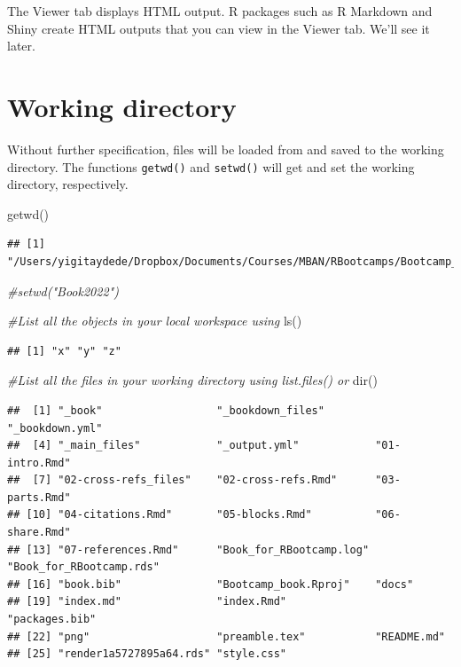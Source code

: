 \documentclass[
]{book}
\newenvironment{Shaded}{\begin{snugshade}}{\end{snugshade}}
\newcommand{\CommentTok}[1]{\textcolor[rgb]{0.56,0.35,0.01}{\textit{#1}}}
\newcommand{\FunctionTok}[1]{\textcolor[rgb]{0.00,0.00,0.00}{#1}}
\newcommand{\NormalTok}[1]{#1}
\theoremstyle{definition}
\theoremstyle{definition}
\theoremstyle{definition}
\theoremstyle{definition}
\theoremstyle{remark}
\begin{document}
The Viewer tab displays HTML output. R packages such as R Markdown and Shiny create HTML outputs that you can view in the Viewer tab. We'll see it later.

\hypertarget{working-directory}{%
\section{Working directory}\label{working-directory}}

Without further specification, files will be loaded from and saved to the working directory. The functions \texttt{getwd()} and \texttt{setwd()} will get and set the working directory, respectively.

\begin{Shaded}
\begin{Highlighting}[]
\FunctionTok{getwd}\NormalTok{()}
\end{Highlighting}
\end{Shaded}

\begin{verbatim}
## [1] "/Users/yigitaydede/Dropbox/Documents/Courses/MBAN/RBootcamps/Bootcamp_book"
\end{verbatim}

\begin{Shaded}
\begin{Highlighting}[]
\CommentTok{\#setwd("Book2022")}

\CommentTok{\#List all the objects in your local workspace using}
\FunctionTok{ls}\NormalTok{()}
\end{Highlighting}
\end{Shaded}

\begin{verbatim}
## [1] "x" "y" "z"
\end{verbatim}

\begin{Shaded}
\begin{Highlighting}[]
\CommentTok{\#List all the files in your working directory using list.files() or }
\FunctionTok{dir}\NormalTok{()}
\end{Highlighting}
\end{Shaded}

\begin{verbatim}
##  [1] "_book"                  "_bookdown_files"        "_bookdown.yml"         
##  [4] "_main_files"            "_output.yml"            "01-intro.Rmd"          
##  [7] "02-cross-refs_files"    "02-cross-refs.Rmd"      "03-parts.Rmd"          
## [10] "04-citations.Rmd"       "05-blocks.Rmd"          "06-share.Rmd"          
## [13] "07-references.Rmd"      "Book_for_RBootcamp.log" "Book_for_RBootcamp.rds"
## [16] "book.bib"               "Bootcamp_book.Rproj"    "docs"                  
## [19] "index.md"               "index.Rmd"              "packages.bib"          
## [22] "png"                    "preamble.tex"           "README.md"             
## [25] "render1a5727895a64.rds" "style.css"
\end{verbatim}
\end{document}
